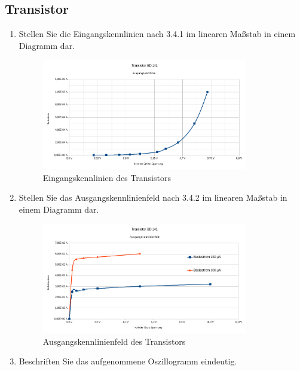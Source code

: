 \subsection{Transistor}
\begin{enumerate}[label=\alph*)]
	\item Stellen Sie die Eingangskennlinien nach 3.4.1 im linearen Maßstab in einem Diagramm dar.
    \begin{figure}[h!]
      \begin{center}
        \includegraphics[width=0.85\textwidth]{img/4.3.a.1}
      \end{center}
      \caption{Eingangskennlinien des Transistors}
    \end{figure}
    
	\item Stellen Sie das Ausgangskennlinienfeld nach 3.4.2 im linearen Maßstab in einem Diagramm dar.
    \begin{figure}[h!]
      \begin{center}
        \includegraphics[width=0.85\textwidth]{img/4.3.b.1}
      \end{center}
      \caption{Ausgangskennlinienfeld des Transistors}
    \end{figure}

	\item Beschriften Sie das aufgenommene Oszillogramm eindeutig.
\end{enumerate}
